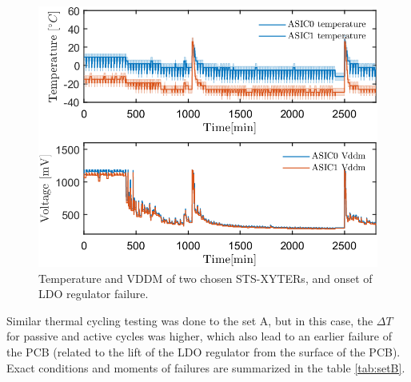 \begin{figure}[!h]
\centering
\includegraphics[width=0.6\columnwidth]{Chapter4/images/temps_vddm.png}
\caption{Temperature and VDDM of two chosen STS-XYTERs, and onset of \gls{LDO} regulator failure.}
\label{fig_cold_startup_vddm}
\end{figure}

Similar thermal cycling testing was done to the set A, but in this case, the $\Delta T$ for passive and active cycles was higher, which also lead to an earlier failure of the \gls{PCB} (related to the lift of the \gls{LDO} regulator from the surface of the \gls{PCB}). Exact conditions and moments of failures are summarized in the table \ref{tab:setB}.

